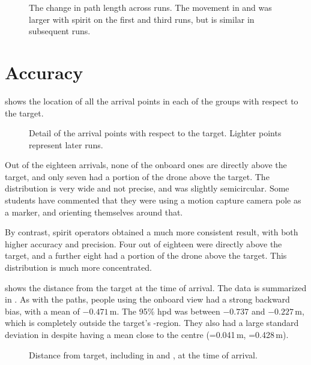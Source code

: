   \begin{figure}[h]
    \centering
    
    \caption[Path lengths across runs]{The change in path length across runs. The movement in  and  was larger with \gls{spirit} on the first and third runs, but is similar in subsequent runs.}
    \label{fig:movement_runs}
  \end{figure}

  \section{Accuracy}
   shows the location of all the arrival points in each of the groups with respect to the target.

  \begin{figure}[h]
    \centering
    
    \caption[Arrival overview]{Detail of the arrival points with respect to the target. Lighter points represent later runs.}
    \label{fig:paths_detailed}
  \end{figure}

  Out of the eighteen arrivals, none of the onboard ones are directly above the target, and only seven had a portion of the drone above the target.
  The distribution is very wide and not precise, and was slightly semicircular.
  Some students have commented that they were using a motion capture camera pole as a marker, and orienting themselves around that.

  By contrast, \gls{spirit} operators obtained a much more consistent result, with both higher accuracy and precision.
  Four out of eighteen were directly above the target, and a further eight had a portion of the drone above the target.
  This distribution is much more concentrated.

   shows the distance from the target at the time of arrival.
  The data is summarized in .
  As with the paths, people using the onboard view had a strong backward bias, with a mean of $-0.471$\,m.
  The 95\% \gls{hpd} was between $-0.737$ and $-0.227$\,m, which is completely outside the target's -region.
  They also had a large standard deviation in  despite having a mean close to the centre (=0.041\,m, =0.428\,m).

  \begin{figure}[h]
    \centering
    
    \caption[Arrival distance]{Distance from target, including in  and , at the time of arrival.}
    \label{fig:distance}
  \end{figure}

